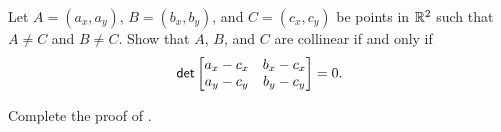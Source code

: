 \begin{exercise}
Let \(A = (a_x,a_y)\), \(B = (b_x,b_y)\), and \(C = (c_x,c_y)\) be points in \(\mathbb{R}^2\) such that \(A \neq C\) and \(B \neq C\).
Show that \(A\), \(B\), and \(C\) are collinear if and only if \[ \mathsf{det} \begin{bmatrix} a_x - c_x & b_x - c_x \\ a_y - c_y & b_y - c_y \end{bmatrix} = 0. \]
\end{exercise}


\begin{exercise}
Complete the proof of .
\end{exercise}
